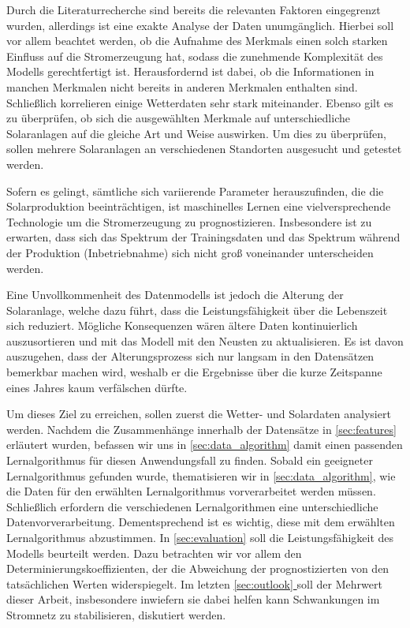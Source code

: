 \documentclass[12pt, a4paper]{article}
\newcommand*{\fullref}[1]{\hyperref[{#1}]{\autoref*{#1} \nameref*{#1}}}
\begin{document}
Durch die Literaturrecherche sind bereits die relevanten Faktoren eingegrenzt wurden, allerdings ist eine exakte Analyse der Daten unumgänglich. Hierbei soll vor allem beachtet werden, ob die Aufnahme des Merkmals einen solch starken Einfluss auf die Stromerzeugung hat, sodass die zunehmende Komplexität des Modells gerechtfertigt ist. Herausfordernd ist dabei, ob die Informationen in manchen Merkmalen nicht bereits in anderen Merkmalen enthalten sind. Schließlich korrelieren einige Wetterdaten sehr stark miteinander. Ebenso gilt es zu überprüfen, ob sich die ausgewählten Merkmale auf unterschiedliche Solaranlagen auf die gleiche Art und Weise auswirken. Um dies zu überprüfen, sollen mehrere Solaranlagen an verschiedenen Standorten ausgesucht und getestet werden.

Sofern es gelingt, sämtliche sich variierende Parameter herauszufinden, die die Solarproduktion beeinträchtigen, ist maschinelles Lernen eine vielversprechende Technologie um die Stromerzeugung zu prognostizieren. Insbesondere ist zu erwarten, dass sich das Spektrum der Trainingsdaten und das Spektrum während der Produktion (Inbetriebnahme) sich nicht groß voneinander unterscheiden werden.

Eine Unvollkommenheit des Datenmodells ist jedoch die Alterung der Solaranlage, welche dazu führt, dass die Leistungsfähigkeit über die Lebenszeit sich reduziert. Mögliche Konsequenzen wären ältere Daten kontinuierlich auszusortieren und mit das Modell mit den Neusten zu aktualisieren. Es ist davon auszugehen, dass der Alterungsprozess sich nur langsam in den Datensätzen bemerkbar machen wird, weshalb er die Ergebnisse über die kurze Zeitspanne eines Jahres kaum verfälschen dürfte.

Um dieses Ziel zu erreichen, sollen zuerst die Wetter- und Solardaten analysiert werden. Nachdem die Zusammenhänge innerhalb der Datensätze in \autoref{sec:features} erläutert wurden, befassen wir uns in \autoref{sec:data_algorithm} damit einen passenden Lernalgorithmus für diesen Anwendungsfall zu finden. Sobald ein geeigneter Lernalgorithmus gefunden wurde, thematisieren wir in \autoref{sec:data_algorithm}, wie die Daten für den erwählten Lernalgorithmus vorverarbeitet werden müssen. Schließlich erfordern die verschiedenen Lernalgorithmen eine unterschiedliche Datenvorverarbeitung. Dementsprechend ist es wichtig, diese mit dem erwählten Lernalgorithmus abzustimmen. In \autoref{sec:evaluation} soll die Leistungsfähigkeit des Modells beurteilt werden. Dazu betrachten wir vor allem den Determinierungskoeffizienten, der die Abweichung der prognostizierten von den tatsächlichen Werten widerspiegelt. Im letzten \fullref{sec:outlook} soll der Mehrwert dieser Arbeit, insbesondere inwiefern sie dabei helfen kann Schwankungen im Stromnetz zu stabilisieren, diskutiert werden.
 
\end{document}
